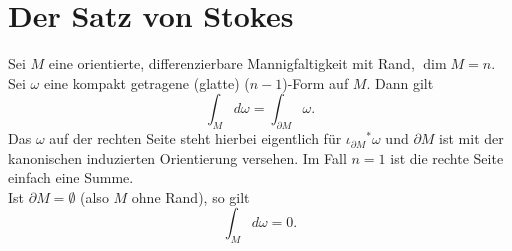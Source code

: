 \chapter{Der Satz von Stokes}

\begin{thm}\autolabel
	Sei $M$ eine orientierte, differenzierbare Mannigfaltigkeit mit Rand, $\dim M = n$. Sei $\omega$ eine kompakt getragene (glatte) ($n-1$)-Form auf $M$. Dann gilt
	\[ \int_M d\omega = \int_{\partial M} \omega. \]
	Das $\omega$ auf der rechten Seite steht hierbei eigentlich für ${\iota_{\partial M}}^*\omega$ und $\partial M$ ist mit der kanonischen induzierten Orientierung versehen. Im Fall $n=1$ ist die rechte Seite einfach eine Summe.\\
	Ist $\partial M = \emptyset$ (also $M$ ohne Rand), so gilt
	\[ \int_M d\omega = 0. \]
\end{thm}


